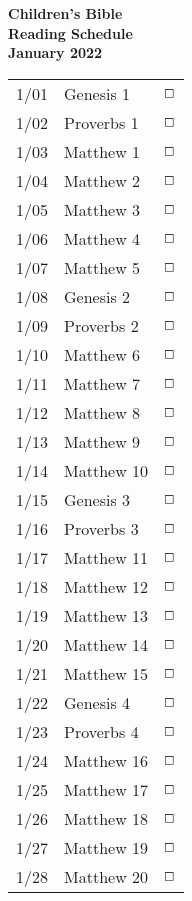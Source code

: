 \documentclass[10pt,landscape,letterpaper]{article}
\begin{document}
\begin{multicols}{5}
\begin{tabular}{p{0.3in}p{0.75in}p{0.4in}}
\end{tabular}

\begin{center}
\textbf{Children's Bible\\
Reading Schedule\\January 2022}
\end{center}

\begin{tabular}{p{0.3in}p{0.75in}p{0.4in}}
1/01 & \textcolor[rgb]{0.98,0.00,0.00}{Genesis 1} & \textcolor[rgb]{0.98,0.00,0.00}{$\boxempty$} \\
1/02 & \textcolor[rgb]{0.98,0.00,0.00}{Proverbs 1} & \textcolor[rgb]{0.98,0.00,0.00}{$\boxempty$} \\
1/03 & Matthew 1 & $\boxempty$ \\
1/04 & Matthew 2 & $\boxempty$ \\
1/05 & Matthew 3 & $\boxempty$ \\
1/06 & Matthew 4 & $\boxempty$ \\
1/07 & Matthew 5 & $\boxempty$ \\

1/08 & \textcolor[rgb]{0.98,0.00,0.00}{Genesis 2} & \textcolor[rgb]{0.98,0.00,0.00}{$\boxempty$} \\
1/09 & \textcolor[rgb]{0.98,0.00,0.00}{Proverbs 2} & \textcolor[rgb]{0.98,0.00,0.00}{$\boxempty$} \\
1/10 & Matthew 6 & $\boxempty$ \\
1/11 & Matthew 7 & $\boxempty$ \\
1/12 & Matthew 8 & $\boxempty$ \\
1/13 & Matthew 9 & $\boxempty$ \\
1/14 & Matthew 10 & $\boxempty$ \\

1/15 & \textcolor[rgb]{0.98,0.00,0.00}{Genesis 3} & \textcolor[rgb]{0.98,0.00,0.00}{$\boxempty$} \\
1/16 & \textcolor[rgb]{0.98,0.00,0.00}{Proverbs 3} & \textcolor[rgb]{0.98,0.00,0.00}{$\boxempty$} \\
1/17 & Matthew 11 & $\boxempty$ \\
1/18 & Matthew 12 & $\boxempty$ \\
1/19 & Matthew 13 & $\boxempty$ \\
1/20 & Matthew 14 & $\boxempty$ \\
1/21 & Matthew 15 & $\boxempty$ \\

1/22 & \textcolor[rgb]{0.98,0.00,0.00}{Genesis 4} & \textcolor[rgb]{0.98,0.00,0.00}{$\boxempty$} \\
1/23 & \textcolor[rgb]{0.98,0.00,0.00}{Proverbs 4} & \textcolor[rgb]{0.98,0.00,0.00}{$\boxempty$} \\
1/24 & Matthew 16 & $\boxempty$ \\
1/25 & Matthew 17 & $\boxempty$ \\
1/26 & Matthew 18 & $\boxempty$ \\
1/27 & Matthew 19 & $\boxempty$ \\
1/28 & Matthew 20 & $\boxempty$ \\


\end{tabular}
\end{multicols}
\end{document}
